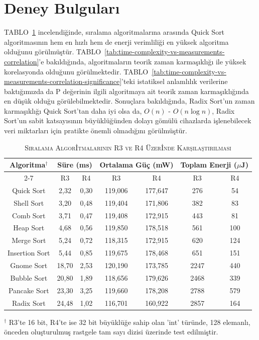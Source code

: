 \documentclass[conference, a4paper]{IEEEtran}
\renewcommand\tablename{TABLO}
\begin{document}
\section{Deney Bulguları}

\tablename~\ref{tab:sıralama-algo} incelendiğinde, sıralama algoritmalarına arasında Quick Sort algoritmasının hem en hızlı hem de enerji verimliliği en yüksek algoritma olduğunu görülmüştür. \tablename~\ref{tab:time-complexity-vs-measurements-correlation}’e bakıldığında, algoritmaların teorik zaman karmaşıklığı ile yüksek korelasyonda olduğunu görülmektedir. \tablename~\ref{tab:time-complexity-vs-measurements-correlation-significance}’teki istatiksel anlamlılık verilerine baktığımızda da P değerinin ilgili algoritmaya ait teorik zaman karmaşıklığında en düşük olduğu görülebilmektedir. Sonuçlara bakıldığında, Radix Sort'un zaman karmaşıklığı Quick Sort'tan daha iyi olsa da, {$O(n)$} - {$O(n \log n)$}, Radix Sort'un sabit katsayısının büyüklüğünden dolayı gömülü cihazlarda işlenebilecek veri miktarları için pratikte önemli olmadığını görülmüştür. 

\begin{table}[h]
  \centering
  \caption{\textsc{Sıralama Algor{\footnotesize İ}tmalarının R3 ve R4 Üzer{\footnotesize İ}nde Karşılaştırılması}}
  \label{tab:sıralama-algo}
  \begin{tabular}{|c|c|c|c|c|c|c|}
    \hline
    \multirow{2}{*}{Algoritma$^{\dagger}$} & \multicolumn{2}{c|}{Süre (ms)} & \multicolumn{2}{c|}{Ortalama Güç (mW)} & \multicolumn{2}{c|}{Toplam Enerji ($\mu$J)} \\
    \cline{2-7}
    & R3 & R4 & R3 & R4 & R3 & R4 \\
    \hline
    Quick Sort & 2,32 & 0,30 & 119,006 & 177,647 & 276 & 54 \\
    \hline
    Shell Sort & 3,20 & 0,48 & 119,404 & 171,806 & 382 & 83 \\
    \hline
    Comb Sort & 3,71 & 0,47 & 119,408 & 172,915 & 443 & 81 \\
    \hline
    Heap Sort & 4,68 & 0,56 & 119,850 & 178,518 & 561 & 100 \\
    \hline
    Merge Sort & 5,24 & 0,72 & 118,315 & 172,915 & 620 & 124 \\
    \hline
    Insertion Sort & 5,44 & 0,85 & 119,675 & 178,468 & 651 & 151 \\
    \hline
    Gnome Sort & 18,70 & 2,53 & 120,190 & 173,785 & 2247 & 440 \\
    \hline
    Bubble Sort & 20,80 & 1,89 & 118,656 & 179,626 & 2468 & 339 \\
    \hline
    Pancake Sort & 23,30 & 3,25 & 119,660 & 178,208 & 2788 & 579 \\
    \hline
    Radix Sort & 24,48 & 1,02 & 116,701 & 160,922 & 2857 & 164 \\
    \hline
  \end{tabular}
  \vspace{1mm}

  \raggedright\footnotesize{$^{\dagger}$ R3'te 16 bit, R4'te ise 32 bit büyüklüğe sahip olan 'int' türünde, 128 elemanlı, önceden oluşturulmuş rastgele tam sayı dizisi üzerinde test edilmiştir.}
\end{table}
\end{document}
